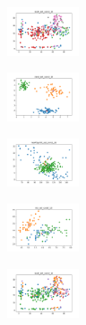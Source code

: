 \begin{figure}[H]
    \hfill
    \begin{subfigure}
        \centering
        \includegraphics[width=0.234\textwidth]{img/am01mej/ecoli_set_const_10_277451237_clust.png}
    \end{subfigure}
    \hfill
    \begin{subfigure}
        \centering
        \includegraphics[width=0.234\textwidth]{img/am01mej/rand_set_const_10_277451237_clust.png}
    \end{subfigure}
    \hfill
    \begin{subfigure}
        \centering
        \includegraphics[width=0.234\textwidth]{img/am01mej/newthyroid_set_const_10_277451237_clust.png}
    \end{subfigure}
    \hfill
    \begin{subfigure}
        \centering
        \includegraphics[width=0.234\textwidth]{img/am01mej/iris_set_const_10_49258669_clust.png}
    \end{subfigure}
    \hfill
    \begin{subfigure}
        \centering
        \includegraphics[width=0.234\textwidth]{img/am01mej/ecoli_set_const_10_49258669_clust.png}
    \end{subfigure}
    \hfill
    \begin{subfigure}

\end{subfigure}
\end{figure}
